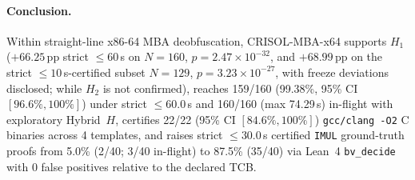 \documentclass[11pt,a4paper]{article}
\begin{document}
\paragraph{Conclusion.}
Within straight-line x86-64 MBA deobfuscation, CRISOL-MBA-x64 supports $H_1$ ($+66.25$\,pp strict $\le 60$\,s on $N=160$, $p = 2.47 \times 10^{-32}$, and $+68.99$\,pp on the strict $\le 10$\,s-certified subset $N=129$, $p = 3.23 \times 10^{-27}$, with freeze deviations disclosed; while $H_2$ is not confirmed), reaches 159/160 (99.38\%, 95\% CI $[96.6\%, 100\%]$) under strict $\le 60.0$\,s and 160/160 (max 74.29\,s) in-flight with exploratory Hybrid~$H$, certifies 22/22 (95\% CI $[84.6\%, 100\%]$) \texttt{gcc/clang -O2} C binaries across 4 templates, and raises strict $\le 30.0$\,s certified \texttt{IMUL} ground-truth proofs from 5.0\% (2/40; 3/40 in-flight) to 87.5\% (35/40) via Lean~4 \texttt{bv\_decide} with 0 false positives relative to the declared TCB.



\end{document}

